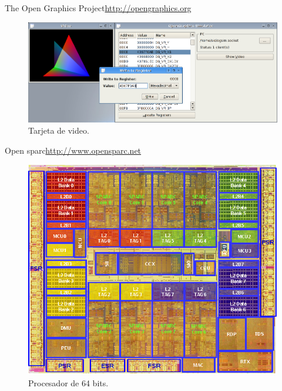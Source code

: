 \documentclass{beamer}
\begin{document}
\begin{frame}{The Open Graphics Project}{\url{http://opengraphics.org}}
  \begin{figure}
    \includegraphics[scale=0.35]{img/ogsim-screen1}
    \caption{Tarjeta de video.}
    \label{fig:ogp}
  \end{figure}
\end{frame}

\begin{frame}{Open sparc}{\url{http://www.opensparc.net}}
  \begin{figure}
    \includegraphics[scale=0.4]{img/ultrasparc-t2-layout}
    \caption{Procesador de 64 bits.}
    \label{fig:opensparc}
  \end{figure}
\end{frame}
\end{document}
